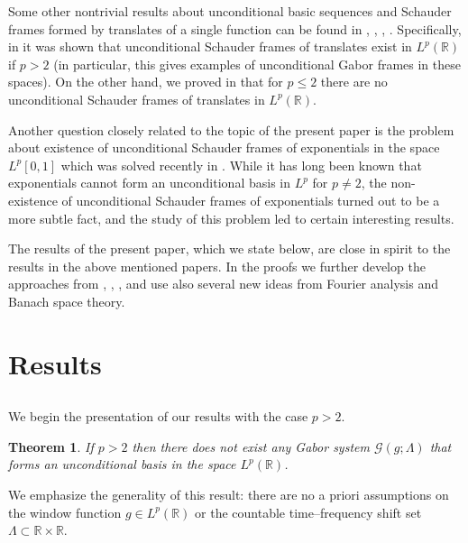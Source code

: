 \documentclass[reqno,a4paper,12pt]{amsart}
\numberwithin{equation}{section}
\numberwithin{figure}{section}
\newcommand\R{\mathbb{R}}
\newcommand\G{\mathcal{G}}
\newcommand\1{\mathds{1}}
\renewcommand\le{\leqslant}
\theoremstyle{plain}
\newtheorem{thm}{Theorem}[section]
\theoremstyle{definition}
\begin{document}
Some other nontrivial results about unconditional basic sequences and Schauder frames formed by translates of a single function can be found in \cite{OSSZ11}, \cite{FOSZ14}, \cite{BC20}, \cite{LT25a}. Specifically, in \cite{FOSZ14} it was shown that unconditional Schauder frames of translates exist in $L^p(\R)$ if $p > 2$ (in particular, this gives examples of uncon\-ditional Gabor frames in these spaces). On the other hand, we proved in \cite{LT25a} that for $p\le 2$ there are no unconditional Schauder frames of translates in $L^p(\R)$.

Another question closely related to the topic of the present paper is the problem about existence of unconditional Schauder frames of exponentials in the space $L^p[0,1]$ which was solved recently in \cite{LT25b}. While it has long been known that exponentials cannot form an unconditional basis in $L^p$ for $p\neq2$, the non-existence of unconditional Schauder frames of exponentials turned out to be a more subtle fact, and the study of this problem led to certain interesting results.

The results of the present paper, which we state below, are close in spirit to the results in the above mentioned papers. In the proofs we further develop the approaches from \cite{OSSZ11}, \cite{FOSZ14}, \cite{LT25a}, \cite{LT25b} and use also several new ideas from Fourier analysis and Banach space theory.






\section{Results}


\subsection{}

We begin the presentation of our results with the case $p > 2$.

\begin{thm}\label{thm:nobases_p>2}
If $p > 2$ then there does not exist any Gabor system
$\G(g;\Lambda)$ that forms an
unconditional basis in the space $L^p(\R)$.
\end{thm}

We emphasize the generality of this result: there are no a priori assumptions on the window function $g\in L^p(\R)$ or the countable time--frequency shift set $\Lambda\subset\R \times \R$. 
\end{document}
